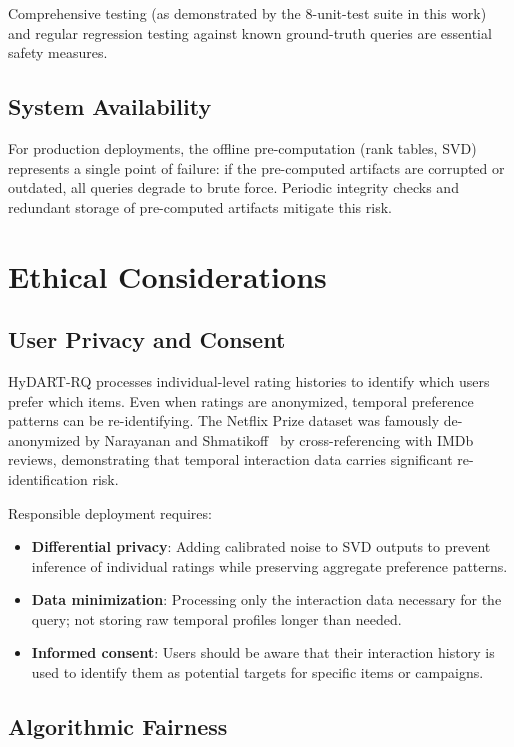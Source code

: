 Comprehensive testing (as demonstrated by the 8-unit-test suite in this work) and regular regression testing against known ground-truth queries are essential safety measures.

\subsection{System Availability}

For production deployments, the offline pre-computation (rank tables, SVD) represents a single point of failure: if the pre-computed artifacts are corrupted or outdated, all queries degrade to brute force. Periodic integrity checks and redundant storage of pre-computed artifacts mitigate this risk.

\section{Ethical Considerations}

\subsection{User Privacy and Consent}

HyDART-RQ processes individual-level rating histories to identify which users prefer which items. Even when ratings are anonymized, temporal preference patterns can be re-identifying. The Netflix Prize dataset was famously de-anonymized by Narayanan and Shmatikoff~\cite{narayanan2008robust} by cross-referencing with IMDb reviews, demonstrating that temporal interaction data carries significant re-identification risk.

Responsible deployment requires:
\begin{itemize}
  \item \textbf{Differential privacy}: Adding calibrated noise to SVD outputs to prevent inference of individual ratings while preserving aggregate preference patterns.
  \item \textbf{Data minimization}: Processing only the interaction data necessary for the query; not storing raw temporal profiles longer than needed.
  \item \textbf{Informed consent}: Users should be aware that their interaction history is used to identify them as potential targets for specific items or campaigns.
\end{itemize}

\subsection{Algorithmic Fairness}

